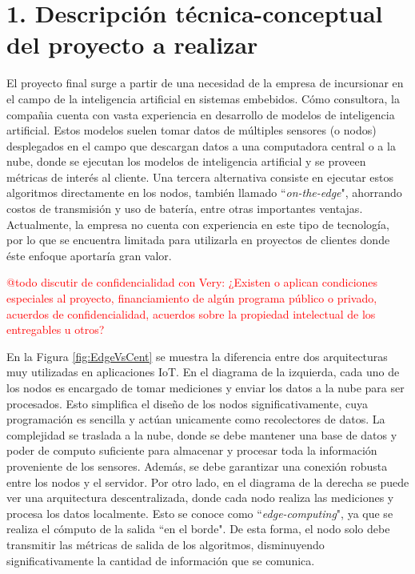\documentclass[
11pt, %
codirector, %
]{charter}
\begin{document}
\section{1. Descripción técnica-conceptual del proyecto a realizar}
\label{sec:descripcion}

El proyecto final surge a partir de una necesidad de la empresa \empclientename  de incursionar en el campo de la inteligencia artificial en sistemas embebidos. Cómo consultora, la compañia cuenta con vasta experiencia en desarrollo de modelos de inteligencia artificial. Estos modelos suelen tomar datos de múltiples sensores (o nodos) desplegados en el campo que descargan datos a una computadora central o a la nube, donde se ejecutan los modelos de inteligencia artificial y se proveen métricas de interés al cliente. Una tercera alternativa consiste en ejecutar estos algoritmos directamente en los nodos, también llamado ``\textit{on-the-edge}", ahorrando costos de transmisión y uso de batería, entre otras importantes ventajas. Actualmente, la empresa no cuenta con experiencia en este tipo de tecnología, por lo que se encuentra limitada para utilizarla en proyectos de clientes donde éste enfoque aportaría gran valor.

\textcolor{red}{@todo discutir de confidencialidad con Very: ¿Existen o aplican condiciones especiales al proyecto, financiamiento de algún programa público o privado, acuerdos de confidencialidad, acuerdos sobre la propiedad intelectual de los entregables u otros?}

En la Figura \ref{fig:EdgeVsCent} se muestra la diferencia entre dos arquitecturas muy utilizadas en aplicaciones IoT. En el diagrama de la izquierda, cada uno de los nodos es encargado de tomar mediciones y enviar los datos a la nube para ser procesados. Esto simplifica el diseño de los nodos significativamente, cuya programación es sencilla y actúan unicamente como recolectores de datos. La complejidad se traslada a la nube, donde se debe mantener una base de datos y poder de computo suficiente para almacenar y procesar toda la información proveniente de los sensores. Además, se debe garantizar una conexión robusta entre los nodos y el servidor. Por otro lado, en el diagrama de la derecha se puede ver una arquitectura descentralizada, donde cada nodo realiza las mediciones y procesa los datos localmente. Esto se conoce como ``\textit{edge-computing}", ya que se realiza el cómputo de la salida ``en el borde". De esta forma, el nodo solo debe transmitir las métricas de salida de los algoritmos, disminuyendo significativamente la cantidad de información que se comunica.
\end{document}
